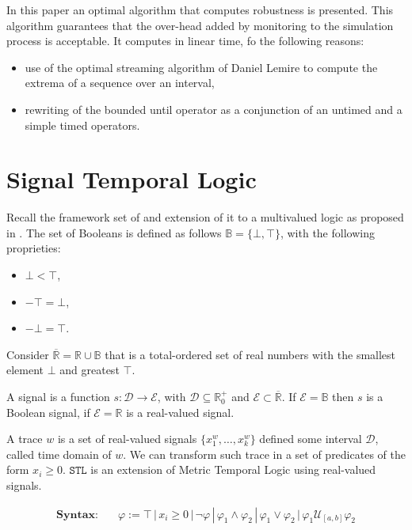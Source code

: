 \documentclass{suftesi}
\newcommand{\STL}{$\mathtt{STL}$ }
\begin{document}
In this paper an optimal algorithm that computes robustness is presented. This algorithm guarantees that the over-head added by monitoring to the simulation process is acceptable. It computes in linear time, fo  the following reasons:
\begin{itemize}[leftmargin=0.5cm]
    \item use of the optimal streaming algorithm of Daniel Lemire to compute the extrema of a sequence over an interval,
    \item rewriting of the bounded until operator as a conjunction of an untimed and a simple timed operators.
\end{itemize}

\section{Signal Temporal Logic}
Recall the framework set of \cite{maler2004}  and extension of it to a multivalued logic as proposed in \cite{fainekos2009}. The set of Booleans is defined as follows $\mathbb{B}=\{\bot,\top\}$, with the following proprieties:
\begin{itemize}[leftmargin=0.5cm]
    \item $\bot<\top$,
    \item $-\top=\bot$,
    \item $-\bot=\top$.
\end{itemize}

Consider $\overline{\mathbb{R}}=\mathbb{R}\cup\mathbb{B}$ that is a total-ordered set of real numbers with the smallest element $\bot$ and greatest $\top$. 

A signal is a function $s:\mathcal{D}\to\mathcal{E}$, with $\mathcal{D}\subseteq\mathbb{R}^+_0$ and $\mathcal{E}\subset\overline{\mathbb{R}}$. If $\mathcal{E}=\mathbb{B}$ then $s$ is a Boolean signal, if $\mathcal{E}=\mathbb{R}$ is a real-valued signal. 

A trace $w$ is a set of real-valued signals $\{x_1^w, \dots, x_k^w\}$ defined some interval $\mathcal{D}$, called time domain of $w$. We can transform such trace in a set of predicates of the form $x_i\geq 0$. \STL is an extension of Metric Temporal Logic using real-valued signals. 

\begin{align*}
    \textbf{Syntax:}    &\quad\varphi:=\top\,|\,x_i\geq0\,|\,\lnot\varphi\,|\,\varphi_1\land\varphi_2\,|\,\varphi_1\lor\varphi_2\,|\,\varphi_1\mathcal{U}_{[a,b]}\varphi_2
\end{align*}
\end{document}
